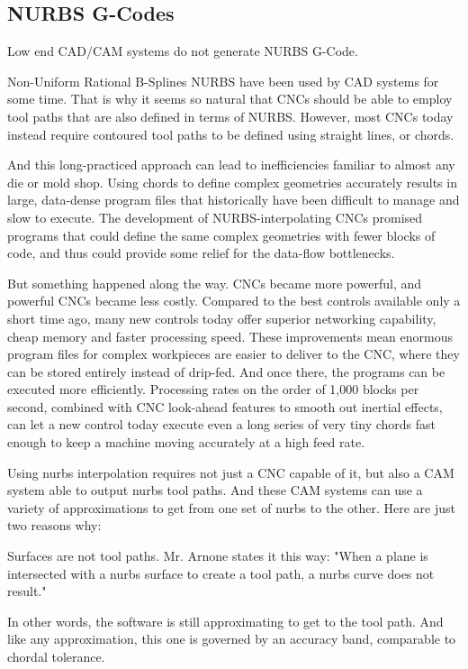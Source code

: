 \subsection{NURBS G-Codes}

Low end CAD/CAM systems do not generate NURBS G-Code.

Non-Uniform Rational B-Splines NURBS have been used by CAD systems for some time. That is why it seems so natural that CNCs should be able to employ tool paths that are also defined in terms of NURBS. However, most CNCs today instead require contoured tool paths to be defined using straight lines, or chords. 

And this long-practiced approach can lead to inefficiencies familiar to almost any die or mold shop. Using chords to define complex geometries accurately results in large, data-dense program files that historically have been difficult to manage and slow to execute. The development of NURBS-interpolating CNCs promised programs that could define the same complex geometries with fewer blocks of code, and thus could provide some relief for the data-flow bottlenecks.

But something happened along the way. CNCs became more powerful, and powerful CNCs became less costly. Compared to the best controls available only a short time ago, many new controls today offer superior networking capability, cheap memory and faster processing speed. These improvements mean enormous program files for complex workpieces are easier to deliver to the CNC, where they can be stored entirely instead of drip-fed. And once there, the programs can be executed more efficiently. Processing rates on the order of 1,000 blocks per second, combined with CNC look-ahead features to smooth out inertial effects, can let a new control today execute even a long series of very tiny chords fast enough to keep a machine moving accurately at a high feed rate.

Using nurbs interpolation requires not just a CNC capable of it, but also a CAM system able to output nurbs tool paths. And these CAM systems can use a variety of approximations to get from one set of nurbs to the other. Here are just two reasons why:

Surfaces are not tool paths. Mr. Arnone states it this way: "When a plane is intersected with a nurbs surface to create a tool path, a nurbs curve does not result." 

In other words, the software is still approximating to get to the tool path. And like any approximation, this one is governed by an accuracy band, comparable to chordal tolerance.

